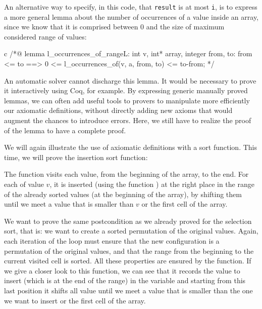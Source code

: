 


An alternative way to specify, in this code, that \texttt{result} is at
most \texttt{i}, is to express a more general lemma about the number of
occurrences of a value inside an array, since we know that it is
comprised between 0 and the size of maximum considered range of values:



\begin{CodeBlock}{c}
/*@
lemma l_occurrences_of_range{L}:
  \forall int v, int* array, integer from, to:
    from <= to ==> 0 <= l_occurrences_of(v, a, from, to) <= to-from;
*/
\end{CodeBlock}



An automatic solver cannot discharge this lemma. It would be necessary
to prove it interactively using Coq, for example. By expressing generic
manually proved lemmas, we can often add useful tools to provers to
manipulate more efficiently our axiomatic definitions, without directly
adding new axioms that would augment the chances to introduce errors.
Here, we still have to realize the proof of the lemma to have a complete
proof.






We will again illustrate the use of axiomatic definitions with a sort
function. This time, we will prove the insertion sort function:





The  function visits each value, from the beginning
of the array, to the end. For each of value $v$, it is inserted (using the
function ) at the right place in the range of the already
sorted values (at the beginning of the array), by shifting them until we meet a
value that is smaller than $v$ or the first cell of the array.




We want to prove the same postcondition as we already proved for the selection
sort, that is: we want to create a sorted permutation of the original values.
Again, each iteration of the loop must ensure that the new configuration is a
permutation of the original values, and that the range from the beginning to
the current visited cell is sorted. All these properties are ensured by the
 function. If we give a closer look to this function, we can
see that it records the value to insert (which is at the end of the range) in
the variable  and starting from this last position it shifts
all value until we meet a value that is smaller than the one we want to insert
or the first cell of the array.




